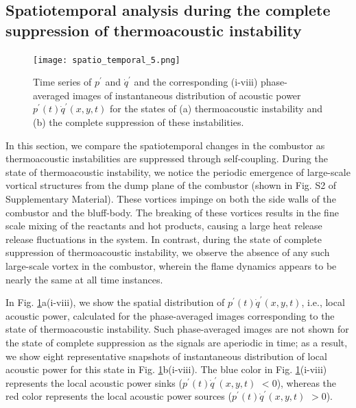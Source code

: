 \documentclass[%
preprint,
 amsmath,amssymb,
 aps,
 pra,
]{revtex4-2}
\begin{document}
\subsection{Spatiotemporal analysis during the complete suppression of thermoacoustic instability} \addvspace{10pt}
\begin{figure}[t!]
\centering
\texttt{[image: spatio\_temporal\_5.png]}
\caption{Time series of $p^{\prime}$ and $\dot{q}^{\prime}$ and the corresponding (i-viii) phase-averaged images of instantaneous distribution of acoustic power $p^\prime(t)\dot{q}^\prime(x,y,t)$ for the states of (a) thermoacoustic instability and (b) the complete suppression of these instabilities.}
\label{fig5}
\end{figure}
In this section, we compare the spatiotemporal changes in the combustor as thermoacoustic instabilities are suppressed through self-coupling. During the state of thermoacoustic instability, we notice the periodic emergence of large-scale vortical structures from the dump plane of the combustor (shown in Fig. S2 of Supplementary Material). These vortices impinge on both the side walls of the combustor and the bluff-body. The breaking of these vortices results in the fine scale mixing of the reactants and hot products, causing a large heat release release fluctuations in the system. In contrast, during the state of complete suppression of thermoacoustic instability, we observe the absence of any such large-scale vortex in the combustor, wherein the flame dynamics appears to be nearly the same at all time instances. 

In Fig. \ref{fig5}a(i-viii), we show the spatial distribution of $p^\prime(t) \dot{q}^\prime(x,y,t)$, i.e., local acoustic power, calculated for the phase-averaged images corresponding to the state of thermoacoustic instability. Such phase-averaged images are not shown for the state of complete suppression as the signals are aperiodic in time; as a result, we show eight representative snapshots of instantaneous distribution of local acoustic power for this state in Fig. \ref{fig5}b(i-viii). The blue color in Fig. \ref{fig5}(i-viii) represents the local acoustic power sinks ($p^\prime(t) \dot{q}^\prime(x,y,t)$ $<0$), whereas the red color represents the local acoustic power sources ($p^\prime(t) \dot{q}^\prime(x,y,t)$ $>0$).
\end{document}
